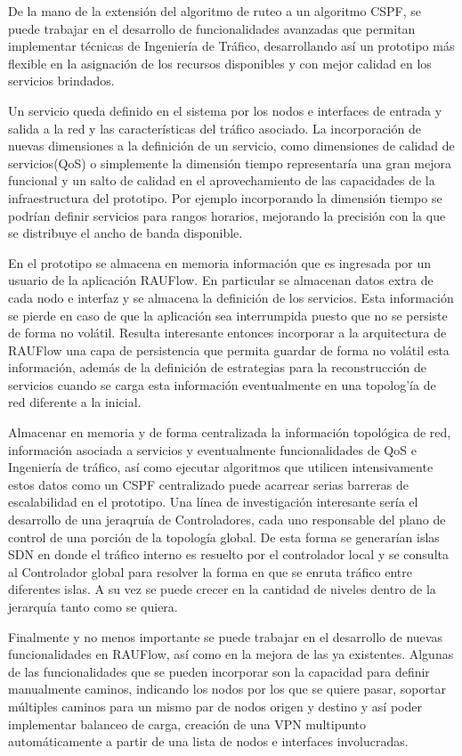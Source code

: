 De la mano de la extensi\'on del algoritmo de ruteo a un algoritmo CSPF, se puede trabajar en el desarrollo de funcionalidades avanzadas que permitan implementar t\'ecnicas de Ingenier\'ia de Tr\'afico, desarrollando as\'i un prototipo m\'as flexible en la asignaci\'on de los recursos disponibles y con mejor calidad en los servicios brindados.

Un servicio queda definido en el sistema por los nodos e interfaces de entrada y salida a la red y las caracter\'isticas del tr\'afico asociado. La incorporaci\'on de nuevas dimensiones a la definici\'on de un servicio, como dimensiones de calidad de servicios(QoS) o simplemente la dimensi\'on tiempo representar\'ia una gran mejora funcional y un salto de calidad en el aprovechamiento de las capacidades de la infraestructura del prototipo. Por ejemplo incorporando la dimensi\'on tiempo se podr\'ian definir servicios para rangos horarios, mejorando la precisi\'on con la que se distribuye el ancho de banda disponible.

En el prototipo se almacena en memoria informaci\'on que es ingresada por un usuario de la aplicaci\'on RAUFlow. En particular se almacenan datos extra de cada nodo e interfaz y se almacena la definici\'on de los servicios. Esta informaci\'on se pierde en caso de que la aplicaci\'on sea interrumpida puesto que no se persiste de forma no volátil. Resulta interesante entonces incorporar a la arquitectura de RAUFlow una capa de persistencia que permita guardar de forma no vol\'atil esta informaci\'on, adem\'as de la definici\'on de estrategias para la reconstrucci\'on de servicios cuando se carga esta informaci\'on eventualmente en una topolog'\'ia de red diferente a la inicial.

Almacenar en memoria y de forma centralizada la informaci\'on topol\'ogica de red, informaci\'on asociada a servicios y eventualmente funcionalidades de QoS e Ingenier\'ia de tr\'afico, as\'i como ejecutar algoritmos que utilicen intensivamente estos datos como un CSPF centralizado puede acarrear serias barreras de escalabilidad en el prototipo. Una l\'inea de investigaci\'on interesante ser\'ia el desarrollo de una jeraqru\'ia de Controladores, cada uno responsable del plano de control de una porci\'on de la topolog\'ia global. De esta forma se generar\'ian islas SDN en donde el tr\'afico interno es resuelto por el controlador local y se consulta al Controlador global para resolver la forma en que se enruta tr\'afico entre diferentes islas. A su vez se puede crecer en la cantidad de niveles dentro de la jerarqu\'ia tanto como se quiera.

Finalmente y no menos importante se puede trabajar en el desarrollo de nuevas funcionalidades en RAUFlow, así como en la mejora de las ya existentes. Algunas de las funcionalidades que se pueden incorporar son la capacidad para definir manualmente caminos, indicando los nodos por los que se quiere  
pasar, soportar m\'ultiples caminos para un mismo par de nodos origen y destino y as\'i poder implementar balanceo de carga, creaci\'on de una VPN multipunto autom\'aticamente a partir de una lista de nodos e interfaces involucradas. 


